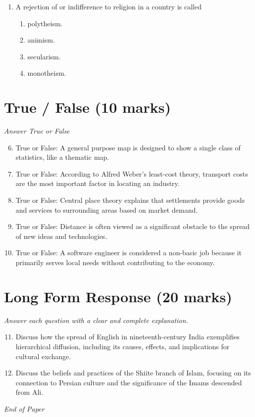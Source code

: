 \documentclass[12pt]{article}
\begin{document}
\begin{enumerate}[label=\arabic*.]
\begin{enumerate}[label=(\alph*)]
    \item Muslims immigrants from North Africa are well integrated in France.
    \item Immigrants to European cities rarely bring their families.
    \item They are usually restricted to certain neighborhoods.
\end{enumerate}
\item A rejection of or indifference to religion in a country is called
\begin{enumerate}[label=(\alph*)]
    \item polytheism.
    \item animism.
    \item secularism.
    \item monotheism.
\end{enumerate}
\end{enumerate}

\section*{True / False (10 marks)}
\textit{Answer True or False}
\begin{enumerate}[label=\arabic*.]
\setcounter{enumi}{5}
\item True or False: A general purpose map is designed to show a single class of statistics, like a thematic map.
\item True or False: According to Alfred Weber's least-cost theory, transport costs are the most important factor in locating an industry.
\item True or False: Central place theory explains that settlements provide goods and services to surrounding areas based on market demand.
\item True or False: Distance is often viewed as a significant obstacle to the spread of new ideas and technologies.
\item True or False: A software engineer is considered a non-basic job because it primarily serves local needs without contributing to the economy.
\end{enumerate}

\section*{Long Form Response (20 marks)}
\textit{Answer each question with a clear and complete explanation.}
\begin{enumerate}[label=\arabic*.]
\setcounter{enumi}{10}
\item Discuss how the spread of English in nineteenth-century India exemplifies hierarchical diffusion, including its causes, effects, and implications for cultural exchange.
\item Discuss the beliefs and practices of the Shiite branch of Islam, focusing on its connection to Persian culture and the significance of the Imams descended from Ali.
\end{enumerate}

\vfill
\noindent\textit{End of Paper}
\end{document}
